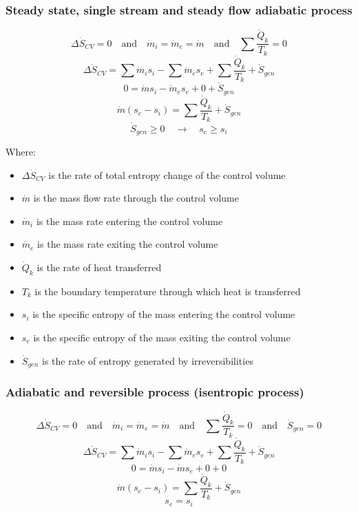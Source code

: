\documentclass[11pt]{article}
\begin{document}
 \newpage

\subsubsection{Steady state, single stream and steady flow adiabatic process}
\label{sec:org6107358}
\[\Delta \dot{S}_{CV} = 0 \quad \text{and} \quad \dot{m}_i = \dot{m}_e = \dot{m} \quad \text{and} \quad \sum \frac{\dot{Q}_k}{T_k} = 0\]
\[\Delta \dot{S}_{CV} = \sum \dot{m}_i s_i - \sum \dot{m}_e s_e + \sum \frac{\dot{Q}_k}{T_k} + \dot{S}_{gen}\]
\[0 = \dot{m} s_i - \dot{m}_e s_e + 0 + \dot{S}_{gen}\]
\[\dot{m} (s_e - s_i) = \sum \frac{\dot{Q}_k}{T_k} + \dot{S}_{gen}\]
\[\dot{S}_{gen} \ge 0 \quad \rightarrow \quad s_e \ge s_i\]

Where:
\begin{itemize}
\item \(\Delta \dot{S}_{CV}\) is the rate of total entropy change of the control volume
\item \(\dot{m}\) is the mass flow rate through the control volume
\item \(\dot{m}_i\) is the mass rate entering the control volume
\item \(\dot{m}_e\) is the mass rate exiting the control volume
\item \(\dot{Q}_k\) is the rate of heat transferred
\item \(T_k\) is the boundary temperature through which heat is transferred
\item \(s_i\) is the specific entropy of the mass entering the control volume
\item \(s_e\) is the specific entropy of the mass exiting the control volume
\item \(\dot{S}_{gen}\) is the rate of entropy generated by irreversibilities
\end{itemize}

 \newpage

\subsubsection{Adiabatic and reversible process (isentropic process)}
\label{sec:org868ea27}
\[\Delta \dot{S}_{CV} = 0 \quad \text{and} \quad \dot{m}_i = \dot{m}_e = \dot{m} \quad \text{and} \quad \sum \frac{\dot{Q}_k}{T_k} = 0 \quad \text{and} \quad \dot{S}_{gen} = 0\]
\[\Delta \dot{S}_{CV} = \sum \dot{m}_i s_i - \sum \dot{m}_e s_e + \sum \frac{\dot{Q}_k}{T_k} + \dot{S}_{gen}\]
\[0 = \dot{m} s_i - \dot{m} s_e + 0 + 0\]
\[\dot{m} (s_e - s_i) = \sum \frac{\dot{Q}_k}{T_k} + \dot{S}_{gen}\]
\[s_e = s_i\]
\end{document}
